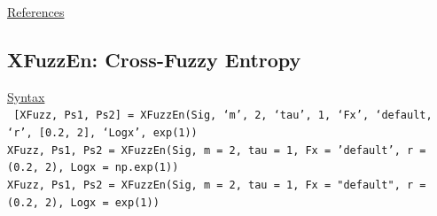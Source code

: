 \documentclass[12pt, a4paper, titlepage, openany]{book}
\begin{document}
\noindent \ul{References}\hspace{1cm}
\cite{Samp1}



\newpage
\subsection{\normalsize XFuzzEn: \hspace{15mm} Cross-Fuzzy Entropy}
\noindent\ul{Syntax} \vspace{6mm} \\ \noindent \texttt{\footnotesize
[XFuzz, Ps1, Ps2] = XFuzzEn(Sig, ‘m’, 2, ‘tau’, 1, ‘Fx’, ‘default, ‘r’, [0.2, 2], ‘Logx’, exp(1))\\
XFuzz, Ps1, Ps2   = XFuzzEn(Sig, m = 2, tau = 1, Fx = 'default', r = (0.2, 2), Logx = np.exp(1))\\
XFuzz, Ps1, Ps2   = XFuzzEn(Sig, m = 2, tau = 1, Fx = "default", r = (0.2, 2), Logx = exp(1))}
\end{document}
